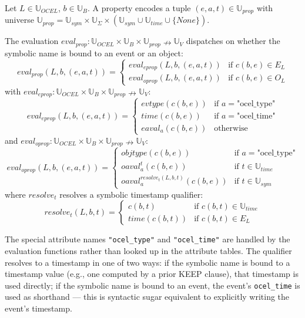 \begin{frameddef}
Let $L \in \mathbb{U}_{OCEL}$, $b \in \mathbb{U}_B$. A property encodes a tuple $(e, a, t) \in \mathbb{U}_{prop}$ with universe $\mathbb{U}_{prop} = \mathbb{U}_{sym} \times \mathbb{U}_\Sigma \times (\mathbb{U}_{sym} \cup \mathbb{U}_{time} \cup \{ None \})$.

The evaluation $eval_{prop} : \mathbb{U}_{OCEL} \times \mathbb{U}_B \times \mathbb{U}_{prop} \nrightarrow \mathbb{U}_V$ dispatches on whether the symbolic name is bound to an event or an object:
\[
eval_{prop}(L, b, (e, a, t)) = \begin{cases}
eval_{eprop}(L, b, (e, a, t)) & \text{if } c(b, e) \in E_L \\
eval_{oprop}(L, b, (e, a, t)) & \text{if } c(b, e) \in O_L
\end{cases}
\]
with $eval_{eprop} : \mathbb{U}_{OCEL} \times \mathbb{U}_B \times \mathbb{U}_{prop} \nrightarrow \mathbb{U}_V$:
\[
eval_{eprop}(L, b, (e, a, t)) = \begin{cases}
evtype(c(b, e)) & \text{if } a = \text{"ocel\_type"} \\
time(c(b, e)) & \text{if } a = \text{"ocel\_time"} \\
eaval_a(c(b, e)) & \text{otherwise}
\end{cases}
\]
and $eval_{oprop} : \mathbb{U}_{OCEL} \times \mathbb{U}_B \times \mathbb{U}_{prop} \nrightarrow \mathbb{U}_V$:
\[
eval_{oprop}(L, b, (e, a, t)) = \begin{cases}
objtype(c(b, e)) & \text{if } a = \text{"ocel\_type"} \\
oaval_a^t(c(b, e)) & \text{if } t \in \mathbb{U}_{time} \\
oaval_a^{resolve_t(L, b, t)}(c(b, e)) & \text{if } t \in \mathbb{U}_{sym}
\end{cases}
\]
where $resolve_t$ resolves a symbolic timestamp qualifier:
\[
resolve_t(L, b, t) = \begin{cases}
c(b, t) & \text{if } c(b, t) \in \mathbb{U}_{time} \\
time(c(b, t)) & \text{if } c(b, t) \in E_L
\end{cases}
\]
\end{frameddef}

The special attribute names \texttt{"ocel\_type"} and \texttt{"ocel\_time"} are handled by the evaluation functions rather than looked up in the attribute tables. The  qualifier resolves to a timestamp in one of two ways: if the symbolic name is bound to a timestamp value (e.g., one computed by a prior KEEP clause), that timestamp is used directly; if the symbolic name is bound to an event, the event's \texttt{ocel\_time} is used as shorthand --- this is syntactic sugar equivalent to explicitly writing the event's timestamp.

